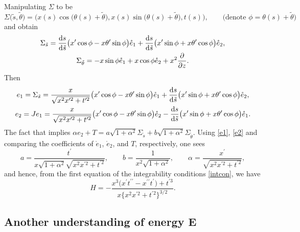 \documentclass[10pt,a4paper]{amsart}
\numberwithin{equation}{section}
\begin{document}
Manipulating $\Sigma$ to be
\begin{equation*} \label{surface2}
\Sigma\bigl(\tilde s,\tilde \theta\bigr)=\bigl(x(s)\cos \bigl(\theta(s)+\tilde \theta\bigr),
x(s)\sin\bigl( \theta(s)+\tilde \theta\bigr), t(s)\bigr),\qquad \bigl(\mbox{denote }
\phi=\theta(s)+\tilde \theta\bigr)
\end{equation*}
and obtain
\begin{gather*}
\Sigma_{\tilde s}=\frac{{\rm d} s}{{\rm d} \tilde s}\bigl(x^{\prime }\cos
\phi-x\theta^{\prime }\sin \phi\bigr)\mathring e_1+\frac{{\rm d}s}{{\rm d} \tilde s}
\bigl(x^{\prime }\sin \phi+x\theta^{\prime }\cos \phi\bigr)\mathring e_2, \\
\Sigma_{\tilde \theta}=-x\sin \phi \mathring e_1+x\cos \phi \mathring
e_2+x^2\frac{\partial}{\partial z}.
\end{gather*}
Then
\begin{gather}
e_1=\Sigma_{\tilde s}=\frac{x}{\sqrt{x^2x^{\prime 2}+t^{\prime 2}}}
\bigl(x^{\prime }\cos \phi-x\theta^{\prime }\sin \phi\bigr)\mathring e_1+\frac{{\rm d}s}{{\rm d}
\tilde s}\bigl(x^{\prime }\sin \phi+x\theta^{\prime }\cos \phi\bigr)\mathring e_2, \label{e1} \\
e_2=Je_1=\frac{x}{\sqrt{x^2x^{\prime 2}+t^{\prime 2}}}\bigl(x^{\prime }\cos
\phi-x\theta^{\prime }\sin \phi\bigr)\mathring e_2-\frac{{\rm d}s}{{\rm d} \tilde s}
\bigl(x^{\prime }\sin \phi+x\theta^{\prime }\cos \phi\bigr)\mathring e_1. \label{e2}
\end{gather}
The fact that  implies
$
\alpha e_2+T=a\sqrt{1+\alpha^2}\Sigma_{\tilde s}+b\sqrt{1+\alpha^2}
\Sigma_{\tilde \theta}$.
Using \eqref{e1}, \eqref{e2} and comparing the coefficients of $\mathring
e_1$, $\mathring e_2$, and $T$, respectively, one sees
\begin{equation} \label{a7}
a=\frac{t^{\prime }}{x\sqrt{1+\alpha^2}\sqrt{x^2x^{\prime 2}+t^{\prime 2}}}
,\qquad b=\frac{1}{x^2\sqrt{1+\alpha^2}},\qquad \alpha=\frac{x^{\prime }}{
\sqrt{x^2x^{\prime 2}+t^{\prime 2}}},
\end{equation}
and hence, from the first equation of the integrability conditions \eqref{intcon}, we have
\begin{equation} \label{a8}
H=-\frac{x^{3}\bigl(x^{\prime }t^{\prime \prime }-x^{\prime \prime
}t^{\prime }\bigr)+t^{\prime 3}}{x\big\{x^2x^{\prime 2}+t^{\prime 2}\big\}^{3/2}}.
\end{equation}

\subsection[Another understanding of energy E]{Another understanding of energy $\boldsymbol{ E}$}
\end{document}

